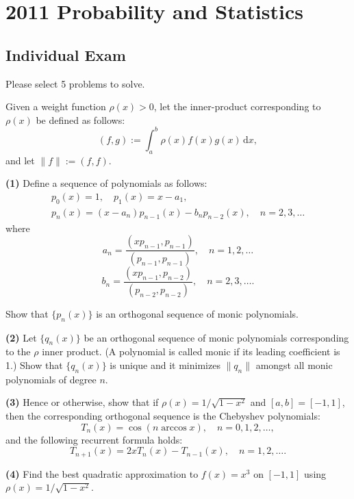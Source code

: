 \section{2011 Probability and Statistics}

\subsection{Individual Exam}
Please select 5 problems to solve.

\begin{exercise}\label{probability:2011:1}
Given a weight function $\rho(x) > 0$, let the inner-product corresponding to $\rho(x)$ be defined as follows:
\[
(f, g) := \int_a^b \rho(x) f(x) g(x) \, \mathrm{d}x,
\]
and let $\|f\| := (f, f)$.

\textbf{(1)} Define a sequence of polynomials as follows:
\[
\begin{array}{l}
p_0(x) = 1, \quad p_1(x) = x - a_1, \\
p_n(x) = (x - a_n) p_{n-1}(x) - b_n p_{n-2}(x), \quad n = 2, 3, \dots
\end{array}
\]
where
\[
a_n = \frac{(x p_{n-1}, p_{n-1})}{(p_{n-1}, p_{n-1})}, \quad n = 1, 2, \dots
\]
\[
b_n = \frac{(x p_{n-1}, p_{n-2})}{(p_{n-2}, p_{n-2})}, \quad n = 2, 3, \dots.
\]

Show that $\{p_n(x)\}$ is an orthogonal sequence of monic polynomials.

\textbf{(2)} Let $\{q_n(x)\}$ be an orthogonal sequence of monic polynomials corresponding to the $\rho$ inner product. (A polynomial is called monic if its leading coefficient is 1.) Show that $\{q_n(x)\}$ is unique and it minimizes $\|q_n\|$ amongst all monic polynomials of degree $n$.

\textbf{(3)} Hence or otherwise, show that if $\rho(x) = 1/\sqrt{1-x^2}$ and $[a,b] = [-1,1]$, then the corresponding orthogonal sequence is the Chebyshev polynomials:
\[
T_n(x) = \cos(n \operatorname{arccos} x), \quad n = 0, 1, 2, \dots,
\]
and the following recurrent formula holds:
\[
T_{n+1}(x) = 2x T_n(x) - T_{n-1}(x), \quad n = 1, 2, \dots.
\]

\textbf{(4)} Find the best quadratic approximation to $f(x) = x^3$ on $[-1,1]$ using $\rho(x) = 1/\sqrt{1-x^2}$.
\end{exercise}

